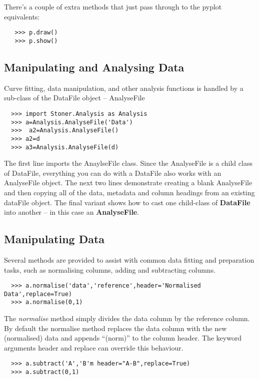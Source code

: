 \documentclass[a4paper,11pt]{scrartcl}
\begin{document}
 There's a couple of extra methods that just pass through to the pyplot equivalents:

 \begin{verbatim}
   >>> p.draw()
   >>> p.show()
 \end{verbatim}



\subsection{Manipulating and Analysing Data}

Curve fitting, data manipulation, and other analysis functions  is handled by a sub-class of the DataFile object -- AnalyseFile

\begin{verbatim}
  >>> import Stoner.Analysis as Analysis
  >>> a=Analysis.AnalyseFile('Data')
  >>>  a2=Analysis.AnalyseFile()
  >>> a2=d
  >>> a3=Analysis.AnalyseFile(d)
\end{verbatim}

The first line imports the AnaylseFile class. Since the AnalyseFile is a child
class of DataFile, everything you can do with a DataFile also works with an
AnalyseFile object. The next two lines demonstrate creating a blank AnalyseFile
and then copying all of the data, metadata and column headings from an existing
dataFile object. The final variant shows how to cast one child-class of \textbf{DataFile} into another -- in this case an \textbf{AnalyseFile}.

\subsection{Manipulating Data}

Several methods are provided to assist with common data fitting and preparation tasks, such as normalising columns, adding and subtracting columns.

\begin{verbatim}
  >>> a.normalise('data','reference',header='Normalised Data',replace=True)
  >>> a.normalise(0,1)
\end{verbatim}

The \textit{normalise} method simply divides the data column by the reference column. By default the normalise method replaces the data column with the new (normalised) data and appends ``(norm)'' to the column header. The keyword arguments header and replace can override this behaviour.

\begin{verbatim}
  >>> a.subtract('A','B'm header="A-B",replace=True)
  >>> a.subtract(0,1)
\end{verbatim}
\end{document}

